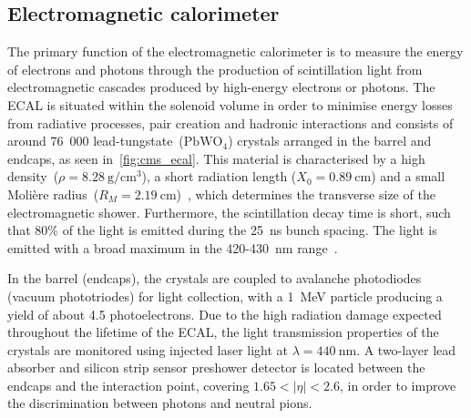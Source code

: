 \subsection{Electromagnetic calorimeter}
The primary function of the electromagnetic calorimeter is to measure the energy of electrons and photons through the production of scintillation light from electromagnetic cascades produced by high-energy electrons or photons. The ECAL is situated within the solenoid volume in order to minimise energy losses from radiative processes, pair creation and hadronic interactions and consists of around 76~000 lead-tungstate~($\mathrm{PbWO}_4$) crystals arranged in the barrel and endcaps, as seen in~\cref{fig:cms_ecal}. This material is characterised by a high density~($\rho = 8.28~\mathrm{g}/\mathrm{cm}^3$), a short radiation length ($X_0=0.89~\mathrm{cm}$) and a small Moli\`ere radius~($R_M = 2.19~\mathrm{cm}$)~\cite{Patrignani:2016xqp}, which determines the transverse size of the electromagnetic shower. Furthermore, the scintillation decay time is short, such that 80\% of the light is emitted during the 25~ns bunch spacing. The light is emitted with a broad maximum in the 420-430~nm range~\cite{Chatrchyan:2008aa}.

In the barrel (endcaps), the crystals are coupled to avalanche photodiodes (vacuum phototriodes) for light collection, with a 1~MeV particle producing a yield of about 4.5 photoelectrons. Due to the high radiation damage expected throughout the lifetime of the ECAL, the light transmission properties of the crystals are monitored  using injected laser light at $\lambda = 440~\mathrm{nm}$. A two-layer lead absorber and silicon strip sensor preshower detector is located between the endcaps and the interaction point, covering $1.65 < |\eta| < 2.6$, in order to improve the discrimination between photons and neutral pions.

